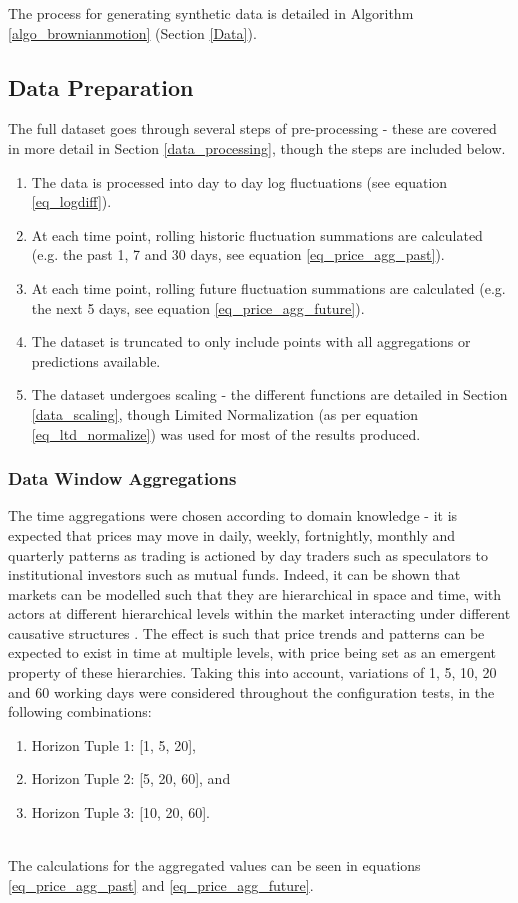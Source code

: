 \documentclass[a4paper,11pt,oneside]{article}
\theoremstyle{plain}
\theoremstyle{definition}
\begin{document}
	The process for generating synthetic data is detailed in Algorithm \ref{algo_brownianmotion} (Section \ref{Data}).
	
	\subsection{Data Preparation}\label{proc_dataprep}
	
	The full dataset goes through several steps of pre-processing - these are covered in more detail in Section \ref{data_processing}, though the steps are included below.
	
	\begin{enumerate}
		\item The data is processed into day to day log fluctuations (see equation \eqref{eq_logdiff}).
		\item At each time point, rolling historic fluctuation summations are calculated (e.g. the past 1, 7 and 30 days, see equation \eqref{eq_price_agg_past}).
		\item At each time point, rolling future fluctuation summations are calculated (e.g. the next 5 days, see equation \eqref{eq_price_agg_future}).
		\item The dataset is truncated to only include points with all aggregations or predictions available.
		\item The dataset undergoes scaling - the different functions are detailed in Section \ref{data_scaling}, though Limited Normalization (as per equation \eqref{eq_ltd_normalize}) was used for most of the results produced.
	\end{enumerate}
	
	\subsubsection{Data Window Aggregations} The time aggregations were chosen according to domain knowledge - it is expected that prices may move in daily, weekly, fortnightly, monthly and quarterly patterns as trading is actioned by day traders such as speculators to institutional investors such as mutual funds. Indeed, it can be shown that markets can be modelled such that they are hierarchical in space and time, with actors at different hierarchical levels within the market interacting under different causative structures \citep{Wilcox}. The effect is such that price trends and patterns can be expected to exist in time at multiple levels, with price being set as an emergent property of these hierarchies. Taking this into account, variations of 1, 5, 10, 20 and 60 working days were considered throughout the configuration tests, in the following combinations:  
	\begin{enumerate}
		\item Horizon Tuple 1: [1, 5, 20],
		\item Horizon Tuple 2: [5, 20, 60], and
		\item Horizon Tuple 3: [10, 20, 60].
	\end{enumerate}
	~\\
	The calculations for the aggregated values can be seen in equations \eqref{eq_price_agg_past} and \eqref{eq_price_agg_future}.
	
\end{document}

